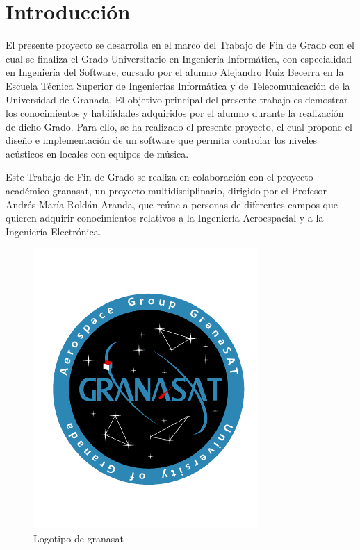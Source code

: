 \chapter{Introducción}\label{cap:capitulo1}

El presente proyecto se desarrolla en el marco del Trabajo de Fin de Grado con el cual se finaliza el Grado Universitario en Ingeniería Informática, con especialidad en Ingeniería del Software, cursado por el alumno Alejandro Ruiz Becerra en la Escuela Técnica Superior de Ingenierías Informática y de Telecomunicación de la Universidad de Granada. El objetivo principal del presente trabajo es demostrar los conocimientos y habilidades adquiridos por el alumno durante la realización de dicho Grado. Para ello, se ha realizado el presente proyecto, el cual propone el diseño e implementación de un software que permita controlar los niveles acústicos en locales con equipos de música.

Este Trabajo de Fin de Grado se realiza en colaboración con el proyecto académico \gls{granasat}, un proyecto multidisciplinario, dirigido por el Profesor Andrés María Roldán Aranda, que reúne a personas de diferentes campos que quieren adquirir conocimientos relativos a la Ingeniería Aeroespacial y a la Ingeniería Electrónica.

\begin{figure}[H]
    \centering
    \includegraphics{figuras/granasat.pdf}
    \caption{Logotipo de \gls{granasat}}
\end{figure}

